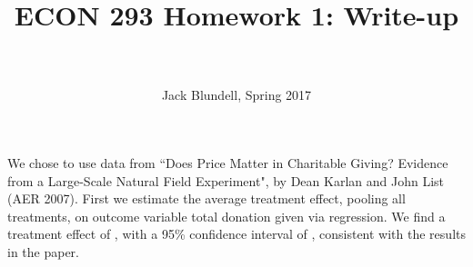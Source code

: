 \documentclass[paper=letter, fontsize=11pt]{scrartcl} %
\title{	
\normalfont \normalsize 
\horrule{0.5pt} \\[0.4cm] %
 \large{{\textbf{ECON 293 Homework 1: Write-up}}} \\ %
\horrule{2pt} \\[0.5cm] %
}
\author{\small{Jack Blundell, Spring 2017}} %
\date{} %
\begin{document}
\maketitle %

\section{}

We chose to use data from ``Does Price Matter in Charitable Giving?
Evidence from a Large-Scale Natural Field Experiment", by Dean Karlan and John List (AER 2007). First we estimate the average treatment effect, pooling all treatments, on outcome variable total donation given via regression. We find a treatment effect of $ $, with a 95\% confidence interval of $ $, consistent with the results in the paper.

\section{}


\section{}

\section{}
\end{document}

